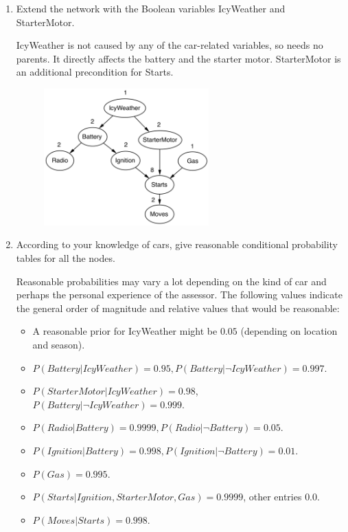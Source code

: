 \documentclass[11pt, a4paper]{article}
\begin{document}
\begin{enumerate}
    \item Extend the network with the Boolean variables IcyWeather and StarterMotor.

    \begin{solution}
        IcyWeather is not caused by any of the car-related variables, so needs no parents. It directly affects the battery and the starter motor. StarterMotor is an additional precondition for Starts.

        \begin{figure}[h]
            \centering
            \includegraphics[width=0.6\textwidth]{figures/e3_car_full.png}
        \end{figure}
    \end{solution}

    \item According to your knowledge of cars, give reasonable conditional probability tables for all the nodes.

    \begin{solution}
        Reasonable probabilities may vary a lot depending on the kind of car and perhaps the personal experience of the assessor. The following values indicate the general order of magnitude and relative values that would be reasonable:
        \begin{itemize}
            \item A reasonable prior for IcyWeather might be $0.05$ (depending on location and season).
            \item $P(Battery|IcyWeather)=0.95,P(Battery|\lnot IcyWeather)=0.997$.
            \item $P(StarterMotor|IcyWeather) = 0.98$, $P(Battery|\lnot IcyWeather) = 0.999$.
            \item $P(Radio|Battery) = 0.9999, P (Radio|\lnot Battery) = 0.05$.
            \item $P(Ignition|Battery) = 0.998, P (Ignition|\lnot Battery) = 0.01$.
            \item $P(Gas) = 0.995$.
            \item $P(Starts|Ignition,StarterMotor,Gas) = 0.9999$, other entries $0.0$.
            \item $P(Moves|Starts) = 0.998$.
        \end{itemize}
    \end{solution}


\end{enumerate}
\end{document}
